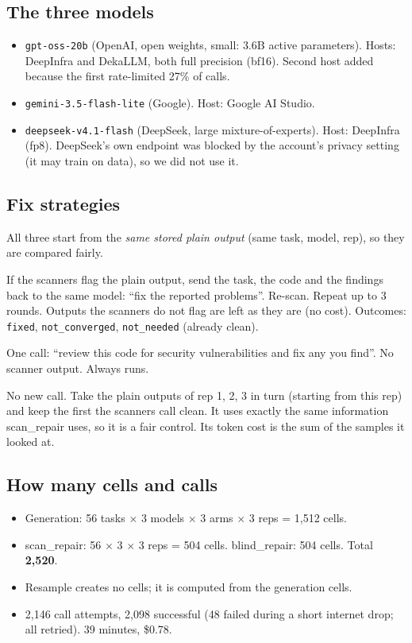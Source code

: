 \documentclass[11pt]{article}
\begin{document}
\subsection{The three models}
\begin{itemize}
\item \texttt{gpt-oss-20b} (OpenAI, open weights, small: 3.6B active parameters). Hosts: DeepInfra and DekaLLM,
      both full precision (bf16). Second host added because the first rate-limited 27\% of calls.
\item \texttt{gemini-3.5-flash-lite} (Google). Host: Google AI Studio.
\item \texttt{deepseek-v4.1-flash} (DeepSeek, large mixture-of-experts). Host: DeepInfra (fp8). DeepSeek's own
      endpoint was blocked by the account's privacy setting (it may train on data), so we did not use it.
\end{itemize}

\subsection{Fix strategies}\label{sec:strategies}
All three start from the \emph{same stored plain output} (same task, model, rep), so they are compared fairly.
\begin{description}[style=nextline, leftmargin=1.2em]
\item[scan\_repair] If the scanners flag the plain output, send the task, the code and the findings back to the same
  model: ``fix the reported problems''. Re-scan. Repeat up to 3 rounds. Outputs the scanners do not flag are left as
  they are (no cost). Outcomes: \texttt{fixed}, \texttt{not\_converged}, \texttt{not\_needed} (already clean).
\item[blind\_repair] One call: ``review this code for security vulnerabilities and fix any you find''. No scanner
  output. Always runs.
\item[resample] No new call. Take the plain outputs of rep 1, 2, 3 in turn (starting from this rep) and keep the first
  the scanners call clean. It uses exactly the same information scan\_repair uses, so it is a fair control. Its token
  cost is the sum of the samples it looked at.
\end{description}

\subsection{How many cells and calls}
\begin{itemize}
\item Generation: 56 tasks $\times$ 3 models $\times$ 3 arms $\times$ 3 reps = 1{,}512 cells.
\item scan\_repair: 56 $\times$ 3 $\times$ 3 reps = 504 cells. blind\_repair: 504 cells. Total \textbf{2{,}520}.
\item Resample creates no cells; it is computed from the generation cells.
\item 2{,}146 call attempts, 2{,}098 successful (48 failed during a short internet drop; all retried).
      39 minutes, \$0.78.
\end{itemize}
\end{document}
